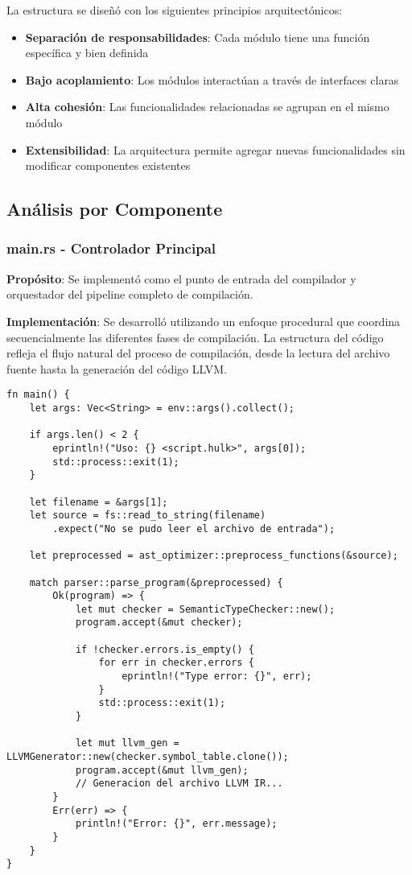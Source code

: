 \documentclass[12pt,a4paper]{article}
\begin{document}
La estructura se diseñó con los siguientes principios arquitectónicos:

\begin{itemize}
    \item \textbf{Separación de responsabilidades}: Cada módulo tiene una función específica y bien definida
    \item \textbf{Bajo acoplamiento}: Los módulos interactúan a través de interfaces claras
    \item \textbf{Alta cohesión}: Las funcionalidades relacionadas se agrupan en el mismo módulo
    \item \textbf{Extensibilidad}: La arquitectura permite agregar nuevas funcionalidades sin modificar componentes existentes
\end{itemize}

\subsection{Análisis por Componente}

\subsubsection{main.rs - Controlador Principal}

\textbf{Propósito}: Se implementó como el punto de entrada del compilador y orquestador del pipeline completo de compilación.

\textbf{Implementación}: Se desarrolló utilizando un enfoque procedural que coordina secuencialmente las diferentes fases de compilación. La estructura del código refleja el flujo natural del proceso de compilación, desde la lectura del archivo fuente hasta la generación del código LLVM.

\begin{lstlisting}[style=rustcode,caption=Función principal del compilador]
fn main() {
    let args: Vec<String> = env::args().collect();
    
    if args.len() < 2 {
        eprintln!("Uso: {} <script.hulk>", args[0]);
        std::process::exit(1);
    }

    let filename = &args[1];
    let source = fs::read_to_string(filename)
        .expect("No se pudo leer el archivo de entrada");

    let preprocessed = ast_optimizer::preprocess_functions(&source);
    
    match parser::parse_program(&preprocessed) {
        Ok(program) => {
            let mut checker = SemanticTypeChecker::new();
            program.accept(&mut checker);
            
            if !checker.errors.is_empty() {
                for err in checker.errors {
                    eprintln!("Type error: {}", err);
                }
                std::process::exit(1);
            }
            
            let mut llvm_gen = LLVMGenerator::new(checker.symbol_table.clone());
            program.accept(&mut llvm_gen);
            // Generacion del archivo LLVM IR...
        }
        Err(err) => {
            println!("Error: {}", err.message);
        }
    }
}
\end{lstlisting}
\end{document}
